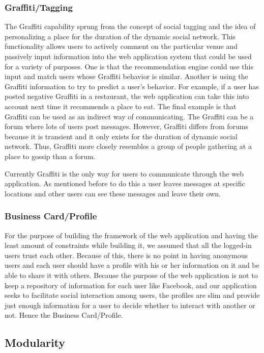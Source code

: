 \documentclass[11pt]{article}
\begin{document}
\subsubsection{Graffiti/Tagging}

The Graffiti capability sprung from the concept of social tagging and the idea of personalizing a place for the duration of the dynamic social network. This functionality allows users to actively comment on the particular venue and passively input information into the web application system that could be used for a variety of purposes. One is that the recommendation engine could use this input and match users whose Graffiti behavior is similar. Another is using the Graffiti information to try to predict a user's behavior. For example, if a user has posted negative Graffiti in a restaurant, the web application can take this into account next time it recommends a place to eat. The final example is that Graffiti can be used as an indirect way of communicating. The Graffiti can be a forum where lots of users post messages. However, Graffiti differs from forums because it is transient and it only exists for the duration of dynamic social network. Thus, Graffiti more closely resembles a group of people gathering at a place to gossip than a forum.

Currently Graffiti is the only way for users to communicate through the web application. As mentioned before to do this a user leaves messages at specific locations and other users can see these messages and leave their own.

\subsubsection{Business Card/Profile}
For the purpose of building the framework of the web application and having the least amount of constraints while building it, we assumed that all the logged-in users trust each other.  Because of this, there is no point in having anonymous users and each user should have a profile with his or her information on it and be able to share it with others. Because the purpose of the web application is not to keep a repository of information for each user like Facebook, and our application seeks to facilitate social interaction among users, the profiles are slim and provide just enough information for a user to decide whether to interact with another or not. Hence the Business Card/Profile.

\subsection{Modularity}
\end{document}
